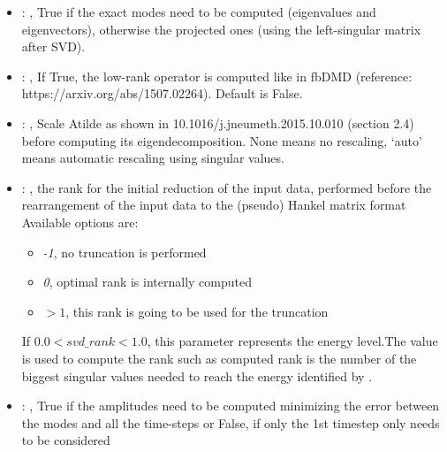 \begin{itemize}
    \item {}: ,
      True if the exact modes need to be computed (eigenvalues and
      eigenvectors),   otherwise the projected ones (using the left-singular matrix after SVD).

    \item {}: ,
      If True, the low-rank operator is computed like in fbDMD (reference:
      https://arxiv.org/abs/1507.02264).                                                  Default is
      False.

    \item {}: ,
      Scale Atilde as shown in 10.1016/j.jneumeth.2015.10.010 (section 2.4) before computing its
      eigendecomposition. None means no rescaling, ‘auto’ means automatic rescaling using singular
      values.

    \item {}: ,
      the rank for the initial reduction of the input data, performed before the rearrangement
      of the input data to the (pseudo) Hankel matrix format
      Available options are:                                                  \begin{itemize}
      \item \textit{-1}, no truncation is performed
      \item \textit{0}, optimal rank is internally computed
      \item \textit{$>1$}, this rank is going to be used for the truncation
      \end{itemize}                                                  If $0.0 < svd\_rank < 1.0$,
      this parameter represents the energy level.The value is used to compute the rank such
      as computed rank is the number of the biggest singular values needed to reach the energy
      identified by                                                    .

    \item {}: ,
      True if the amplitudes need to be computed minimizing the error
      between the modes and all the time-steps or False, if only the 1st timestep only needs to be
      considered


\end{itemize}

